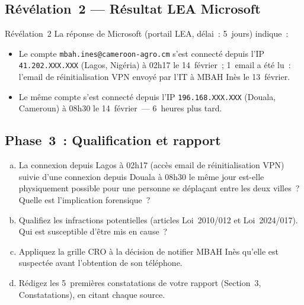 \subsection{Révélation~2 --- Résultat LEA Microsoft}

\begin{boiteRemarque}{Révélation~2}
La réponse de Microsoft (portail LEA, délai~: 5~jours) indique~:
\begin{itemize}
    \item Le compte \texttt{mbah.ines@cameroon-agro.cm} s'est connecté
          depuis l'IP \texttt{41.202.XXX.XXX} (Lagos, Nigéria) à
          02h17 le 14~février~; 1~email a été lu~: l'email de réinitialisation
          VPN envoyé par l'IT à MBAH Inès le 13~février.
    \item Le même compte s'est connecté depuis l'IP
          \texttt{196.168.XXX.XXX} (Douala, Cameroun) à 08h30
          le 14~février~--- 6~heures plus tard.
\end{itemize}
\end{boiteRemarque}

\subsection{Phase~3~: Qualification et rapport}

\begin{boxexo}[title={\ding{45}\quad FAKO --- Étape~3~: Qualification et rapport}]
\begin{enumerate}[(a)]
    \item La connexion depuis Lagos à 02h17 (accès email de réinitialisation
          VPN) suivie d'une connexion depuis Douala à 08h30 le même
          jour est-elle physiquement possible pour une personne
          se déplaçant entre les deux villes~? Quelle est l'implication
          forensique~?
    \item Qualifiez les infractions potentielles (articles Loi~2010/012
          et Loi~2024/017). Qui est susceptible d'être mis en cause~?
    \item Appliquez la grille CRO à la décision de notifier MBAH Inès
          qu'elle est suspectée avant l'obtention de son téléphone.
    \item Rédigez les 5~premières constatations de votre rapport
          (Section~3, Constatations), en citant chaque source.
\end{enumerate}
\end{boxexo}

